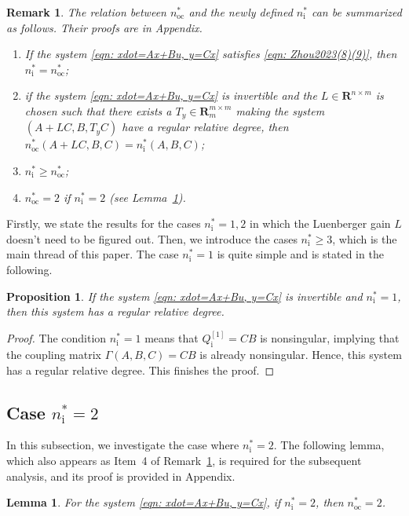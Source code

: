 \documentclass[sort&compress]{elsarticle}
\newtheorem{lemma}{Lemma}
\newtheorem{remark}{Remark}
\newtheorem{prop}{Proposition}
\newcommand\GAmma{\mathit\Gamma}
\newcommand\nsharp{n_\mathrm i^*}
\newcommand\nocstar{n_\mathrm{oc}^*}
\newcommand\Qi{Q_\mathrm i}
\newcommand\R{\mathbf R}
\begin{document}
\begin{remark}\label{rmk: n* and nsharp}
The relation between $\nocstar$ and the newly defined $\nsharp$
can be summarized as follows.
Their proofs are in Appendix.
\begin{enumerate}
\item If the system \eqref{eqn: xdot=Ax+Bu, y=Cx} satisfies
\eqref{eqn: Zhou2023(8)(9)}, then $\nsharp=\nocstar$;
\item if the system \eqref{eqn: xdot=Ax+Bu, y=Cx} is invertible
and the $L\in\R^{n\times m}$ is chosen such that
there exists a $T_y\in\R^{m\times m}_m$
making the system $(A+LC,B,T_yC)$
have a regular relative degree,
then $\nocstar(A+LC,B,C)=\nsharp(A,B,C)$;
\item $\nsharp\ge \nocstar$;
\item $\nocstar=2$ if $\nsharp=2$ (see Lemma~\ref{thm: if nsharp=2 then n*=2}).
\end{enumerate}
\end{remark}

Firstly, we state the results for the cases $\nsharp=1,2$
in which the Luenberger gain $L$ doesn't need to be figured out.
Then, we introduce the cases $\nsharp\ge3$,
which is the main thread of this paper.
The case $\nsharp=1$ is quite simple and is stated in the following.

\begin{prop}
If the system \eqref{eqn: xdot=Ax+Bu, y=Cx} is invertible and
$\nsharp=1$, then this system has a regular relative degree.
\end{prop}

\begin{proof}
The condition $\nsharp=1$ means that $\Qi^{[1]}=CB$ is nonsingular,
implying that the coupling matrix $\GAmma(A,B,C)=CB$ is already nonsingular.
Hence, this system has a regular relative degree.
This finishes the proof.
\end{proof}

\subsection{Case $\nsharp=2$}

In this subsection, we investigate the case where $\nsharp=2$.
The following lemma, which also appears as
Item~4 of Remark~\ref{rmk: n* and nsharp},
is required for the subsequent analysis, and its proof is provided in Appendix.

\begin{lemma}\label{thm: if nsharp=2 then n*=2}
For the system \eqref{eqn: xdot=Ax+Bu, y=Cx},
if $\nsharp=2$, then $\nocstar=2$.
\end{lemma}
\end{document}
